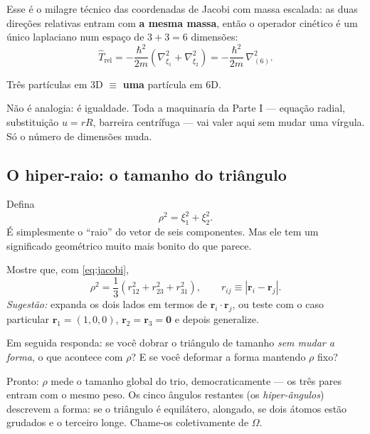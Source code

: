 \documentclass[11pt,a4paper]{article}
\renewcommand{\vec}[1]{\mathbf{#1}}
\begin{document}
Esse é o milagre técnico das coordenadas de Jacobi com massa escalada: as duas
direções relativas entram com \textbf{a mesma massa}, então o operador cinético é um
único laplaciano num espaço de $3+3=6$ dimensões:
\begin{equation}
\hat T_{\text{rel}} = -\frac{\hbar^{2}}{2m}\left(\nabla^{2}_{\xi_{1}} +
\nabla^{2}_{\xi_{2}}\right)
= -\frac{\hbar^{2}}{2m}\,\nabla^{2}_{(6)}.
\label{eq:T6}
\end{equation}

\begin{ideia}
Três partículas em 3D $\equiv$ \textbf{uma} partícula em 6D.

Não é analogia: é igualdade. Toda a maquinaria da Parte I --- equação radial,
substituição $u=rR$, barreira centrífuga --- vai valer aqui sem mudar uma vírgula.
Só o número de dimensões muda.
\end{ideia}

\subsection{O hiper-raio: o tamanho do triângulo}

Defina
\begin{equation}
\rho^{2} = \xi_{1}^{2} + \xi_{2}^{2}.
\end{equation}
É simplesmente o ``raio'' do vetor de seis componentes. Mas ele tem um significado
geométrico muito mais bonito do que parece.

\begin{suavez}
Mostre que, com \eqref{eq:jacobi},
\[
\rho^{2} = \frac{1}{3}\left(r_{12}^{2} + r_{23}^{2} + r_{31}^{2}\right),
\qquad r_{ij} \equiv |\vec r_{i}-\vec r_{j}|.
\]
\emph{Sugestão:} expanda os dois lados em termos de $\vec r_i \cdot \vec r_j$, ou
teste com o caso particular $\vec r_1 = (1,0,0)$, $\vec r_2 = \vec r_3 = \vec 0$ e
depois generalize.

Em seguida responda: se você dobrar o triângulo de tamanho \emph{sem mudar a forma},
o que acontece com $\rho$? E se você deformar a forma mantendo $\rho$ fixo?

\vspace{2.4cm}
\hrulefill
\end{suavez}

Pronto: $\rho$ mede o tamanho global do trio, democraticamente --- os três pares
entram com o mesmo peso. Os cinco ângulos restantes (os \emph{hiper-ângulos})
descrevem a forma: se o triângulo é equilátero, alongado, se dois átomos estão
grudados e o terceiro longe. Chame-os coletivamente de $\Omega$.
\end{document}
